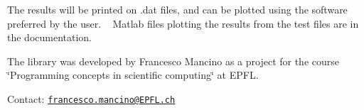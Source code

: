 The results will be printed on .dat files, and can be plotted using the software preferred by the user. ~\newline
 Matlab files plotting the results from the test files are in the documentation.

The library was developed by Francesco Mancino as a project for the course \char`\"{}\+Programming concepts in scientific computing\char`\"{} at E\+P\+F\+L.

Contact\+: \href{mailto:francesco.mancino@EPFL.ch}{\tt francesco.\+mancino@\+E\+P\+F\+L.\+ch} 